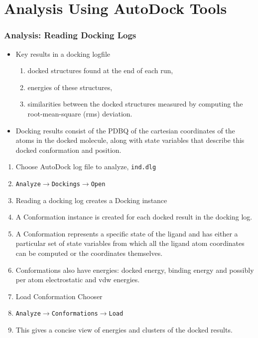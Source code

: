 \documentclass[slidestop,mathserif,compress,xcolor=svgnames]{beamer}
\newenvironment{eblock}[0]
{
\begin{beamerboxesrounded}[upper=uppercol2,lower=lowercol2,shadow=true]}
{\end{beamerboxesrounded}}
\begin{document}
\section{Analysis Using AutoDock Tools}
\begin{frame}[allowframebreaks]
  \frametitle{\small Analysis: Reading Docking Logs}
  \begin{itemize}
    \item Key results in a docking logfile
    \begin{enumerate}
      \item docked structures found at the end of each run,
      \item energies of these structures,
      \item similarities between the docked structures measured by computing the root-mean-square (rms) deviation.
    \end{enumerate}
    \item Docking results consist of the PDBQ of the cartesian coordinates of the atoms in the docked molecule, along with state variables that describe this docked conformation and position.
  \end{itemize}

  \begin{eblock}{}
    \begin{enumerate}
      \item Choose AutoDock log file to analyze, \texttt{ind.dlg}
      \item[] \texttt{Analyze$\rightarrow$Dockings$\rightarrow$Open}
      \item[] Reading a docking log creates a Docking instance
      \item[] A Conformation instance is created for each docked result in the docking log.
      \item[] A Conformation represents a specific state of the ligand and has either a particular set of state variables from which all the ligand atom coordinates can be computed or the coordinates themselves.
      \item[] Conformations also have energies: docked energy, binding energy and possibly per atom electrostatic  and vdw energies.
      \item Load Conformation Chooser
      \item[] \texttt{Analyze$\rightarrow$Conformations$\rightarrow$Load}
      \item[] This gives a concise view of energies and clusters of the docked results.
    \end{enumerate}
  \end{eblock}
\end{frame}
\end{document}
